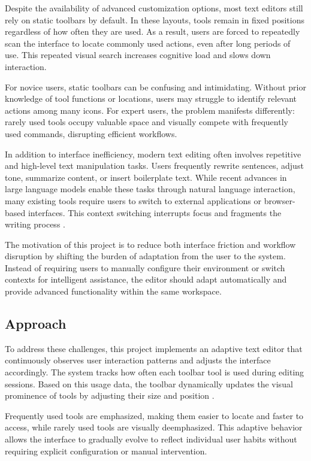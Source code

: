 \documentclass[sigconf]{acmart}
\begin{document}
Despite the availability of advanced customization options, most text editors still rely on static toolbars by default. In these layouts, tools remain in fixed positions regardless of how often they are used. As a result, users are forced to repeatedly scan the interface to locate commonly used actions, even after long periods of use. This repeated visual search increases cognitive load and slows down interaction.

For novice users, static toolbars can be confusing and intimidating. Without prior knowledge of tool functions or locations, users may struggle to identify relevant actions among many icons. For expert users, the problem manifests differently: rarely used tools occupy valuable space and visually compete with frequently used commands, disrupting efficient workflows.

In addition to interface inefficiency, modern text editing often involves repetitive and high-level text manipulation tasks. Users frequently rewrite sentences, adjust tone, summarize content, or insert boilerplate text. While recent advances in large language models enable these tasks through natural language interaction, many existing tools require users to switch to external applications or browser-based interfaces. This context switching interrupts focus and fragments the writing process \cite{LehmannBuschek2024_FuncFlexAI,Kim2024_TowardsFullAuthorship}.

The motivation of this project is to reduce both interface friction and workflow disruption by shifting the burden of adaptation from the user to the system. Instead of requiring users to manually configure their environment or switch contexts for intelligent assistance, the editor should adapt automatically and provide advanced functionality within the same workspace.

\subsection{Approach}

To address these challenges, this project implements an adaptive text editor that continuously observes user interaction patterns and adjusts the interface accordingly. The system tracks how often each toolbar tool is used during editing sessions. Based on this usage data, the toolbar dynamically updates the visual prominence of tools by adjusting their size and position \cite{Hamdani2025_AdaptiveHCI,LehmannBuschek2024_FuncFlexAI}.

Frequently used tools are emphasized, making them easier to locate and faster to access, while rarely used tools are visually deemphasized. This adaptive behavior allows the interface to gradually evolve to reflect individual user habits without requiring explicit configuration or manual intervention.
\end{document}
